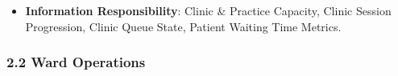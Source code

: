 \begin{itemize}
\begin{itemize}
\begin{itemize}
\end{itemize}


\item
\textbf{Feature: Operational Queue Progression}:


\begin{itemize}

\item
\emph{Function}: \texttt{} — Tracks patient arrival, rooming, consultation in-progress, and check-out states.



\item
\emph{Exposed Service}: \texttt{} — Discloses real-time clinic waiting times and queue states.



\item
\emph{Governed Process}: \textbf{Clinic /\allowbreak{} Operational Queue Progression Process}.



\end{itemize}


\end{itemize}


\item
\textbf{Information Responsibility}: Clinic \& Practice Capacity, Clinic Session Progression, Clinic Queue State, Patient Waiting Time Metrics.



\end{itemize}
\label{rad:hso:87}

\par\smallskip
{}\label{rad:hso:89}
\subsubsection*{2.2 Ward Operations}
\label{rad:hso:90}

